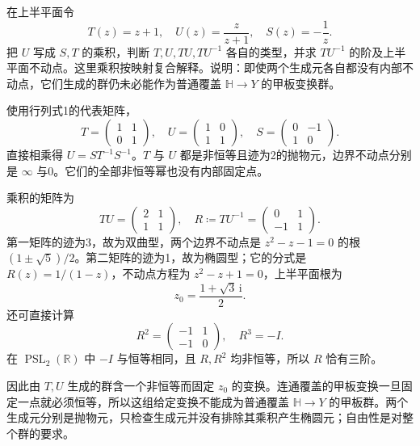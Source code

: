 \begin{exercise}\label{b3:ex:11-7}
在上半平面令
\[
 T(z)=z+1,\quad U(z)=\frac{z}{z+1},\quad S(z)=-\frac1z.
\]
把 \(U\) 写成 \(S,T\) 的乘积，判断 \(T,U,TU,TU^{-1}\) 各自的类型，并求 \(TU^{-1}\) 的阶及上半平面不动点。这里乘积按映射复合解释。说明：即使两个生成元各自都没有内部不动点，它们生成的群仍未必能作为普通覆盖 \(\mathbb H\to Y\) 的甲板变换群。
\end{exercise}
\begin{solution}
使用行列式1的代表矩阵，
\[
 T=\begin{pmatrix}1&1\\0&1\end{pmatrix},\quad
 U=\begin{pmatrix}1&0\\1&1\end{pmatrix},\quad
 S=\begin{pmatrix}0&-1\\1&0\end{pmatrix}.
\]
直接相乘得 \(U=ST^{-1}S^{-1}\)。\(T\) 与 \(U\) 都是非恒等且迹为2的抛物元，边界不动点分别是 \(\infty\) 与0。它们的全部非恒等幂也没有内部固定点。

乘积的矩阵为
\[
 TU=\begin{pmatrix}2&1\\1&1\end{pmatrix},\quad
 R\coloneqq TU^{-1}=\begin{pmatrix}0&1\\-1&1\end{pmatrix}.
\]
第一矩阵的迹为3，故为双曲型，两个边界不动点是 \(z^2-z-1=0\) 的根 \((1\pm\sqrt5)/2\)。第二矩阵的迹为1，故为椭圆型；它的分式是 \(R(z)=1/(1-z)\)，不动点方程为 \(z^2-z+1=0\)，上半平面根为
\[
 z_0=\frac{1+\sqrt3\,\mathrm i}{2}.
\]
还可直接计算
\[
 R^2=\begin{pmatrix}-1&1\\-1&0\end{pmatrix},\quad R^3=-I.
\]
在 \(\operatorname{PSL}_2(\mathbb R)\) 中 \(-I\) 与恒等相同，且 \(R,R^2\) 均非恒等，所以 \(R\) 恰有三阶。

因此由 \(T,U\) 生成的群含一个非恒等而固定 \(z_0\) 的变换。连通覆盖的甲板变换一旦固定一点就必须恒等，所以这组给定变换不能成为普通覆盖 \(\mathbb H\to Y\) 的甲板群。两个生成元分别是抛物元，只检查生成元并没有排除其乘积产生椭圆元；自由性是对整个群的要求。
\end{solution}

